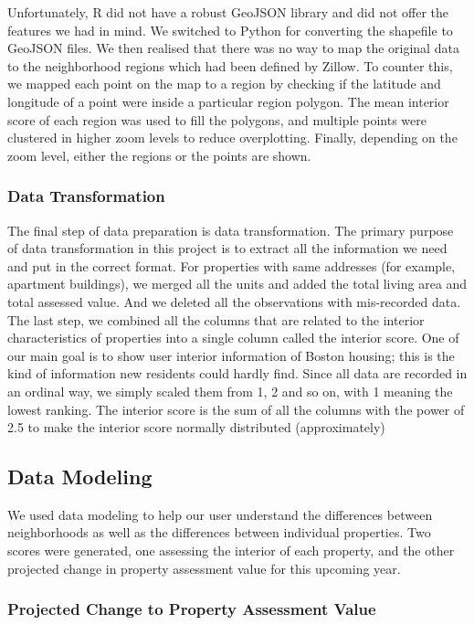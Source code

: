 \documentclass[12pt]{article}
\begin{document}
Unfortunately, R did not have a robust GeoJSON library and did not 
offer the features we had in mind. We switched to Python for converting
the shapefile to GeoJSON files. We then realised that there was no way to
map the original data to the neighborhood regions which had been defined
by Zillow. To counter this, we mapped each point on the map to a region
by checking if the latitude and longitude of a point were inside a
particular region polygon. The mean interior score
of each region was used to fill the polygons, and multiple points were
clustered in higher zoom levels to reduce overplotting. Finally,
depending on the zoom level, either the regions or the points are shown.


\subsubsection{Data Transformation}

The final step of data preparation is data transformation. The primary purpose of data transformation in this project is to extract all the information we need and put in the correct format. For properties with same addresses (for example, apartment buildings), we merged all the units and added the total living area and total assessed value. And we deleted all the observations with mis-recorded data. The last step, we combined all the columns that are related to the interior characteristics of properties into a single column called the interior score. One of our main goal is to show user interior information of Boston housing; this is the kind of information new residents could hardly find. Since all data are recorded in an ordinal way, we simply scaled them from 1, 2 and so on, with 1 meaning the lowest ranking. The interior score is the sum of all the columns with the power of 2.5 to make the interior score normally distributed (approximately)

\subsection{Data Modeling}

We used data modeling to help our user understand the differences between
neighborhoods as well as the differences between individual properties.
Two scores were generated, one assessing the interior of each property,
and the other projected change in property assessment value for this
upcoming year. 

\subsubsection{Projected Change to Property Assessment Value}
\end{document}

